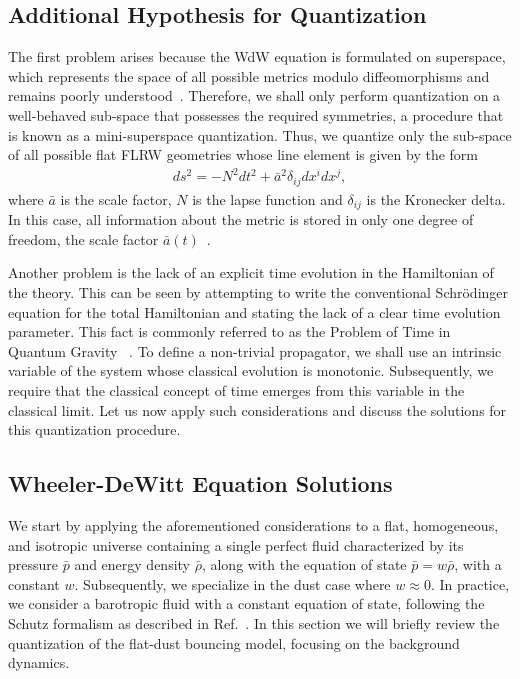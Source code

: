 \documentclass[a4paper,11pt]{article}
\begin{document}
\subsection{Additional Hypothesis for Quantization}

The first problem arises because the WdW equation is formulated on superspace, which
represents the space of all possible metrics modulo diffeomorphisms and remains poorly
understood~\cite{halliwell1990introductory,dewitt1967}. Therefore, we shall only perform
quantization on a well-behaved sub-space that possesses the required symmetries, a
procedure that is known as a mini-superspace quantization. Thus, we quantize only the
sub-space of all possible flat FLRW geometries whose line element is given by the form
\begin{align}
	\label{physmetric}
	ds^2 = -N^{2}dt^2 + \bar{a}^2 \delta_{ij}dx^i dx^j
	,\end{align}
where $\bar{a}$ is the scale factor, $N$ is the lapse function and $\delta_{ij}$ is the
Kronecker delta. In this case, all information about the metric is stored in only one
degree of freedom, the scale factor $\bar{a}(t)$~\cite{nelson2021bouncing}.

Another problem is the lack of an explicit time evolution in the Hamiltonian of the
theory. This can be seen by attempting to write the conventional Schrödinger equation
for the total Hamiltonian and stating the lack of a clear time evolution parameter. This
fact is commonly referred to as the Problem of Time in Quantum Gravity ~\cite
{patrick_time_review,nelson_peter_bouncing_original,bianchi_time}. To define a
non-trivial propagator, we shall use an intrinsic variable of the system whose classical
evolution is monotonic. Subsequently, we require that the classical concept of time
emerges from this variable in the classical limit. Let us now apply such considerations
and discuss the solutions for this quantization procedure.

\subsection{Wheeler-DeWitt Equation Solutions}

We start by applying the aforementioned considerations to a flat, homogeneous, and
isotropic universe containing a single perfect fluid characterized by its pressure
$\bar{p}$ and energy density $\bar{\rho}$, along with the equation of state $\bar{p} =
	w\bar{\rho}$, with a constant $w$. Subsequently, we specialize in the dust case where $w
	\approx 0$. In practice, we consider a barotropic fluid with a constant equation of
state, following the Schutz formalism as described in Ref.~\cite{fluidgeral}. In this
section we will briefly review the quantization of the flat-dust bouncing model,
focusing on the background dynamics.
\end{document}
